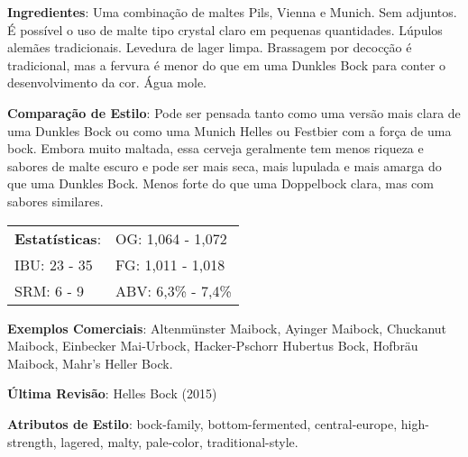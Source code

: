 \textbf{Ingredientes}: Uma combinação de maltes Pils, Vienna e Munich. Sem adjuntos. É possível o uso de malte tipo crystal claro em pequenas quantidades. Lúpulos alemães tradicionais. Levedura de lager limpa. Brassagem por decocção é tradicional, mas a fervura é menor do que em uma Dunkles Bock para conter o desenvolvimento da cor. Água mole.

\textbf{Comparação de Estilo}: Pode ser pensada tanto como uma versão mais clara de uma Dunkles Bock ou como uma Munich Helles ou Festbier com a força de uma bock. Embora muito maltada, essa cerveja geralmente tem menos riqueza e sabores de malte escuro e pode ser mais seca, mais lupulada e mais amarga do que uma Dunkles Bock. Menos forte do que uma Doppelbock clara, mas com sabores similares.

\begin{tabular}{@{}p{35mm}p{35mm}@{}}
  \textbf{Estatísticas}: & OG: 1,064 - 1,072 \\
  IBU: 23 - 35  & FG: 1,011 - 1,018  \\
  SRM: 6 - 9  & ABV: 6,3\% - 7,4\%
\end{tabular}

\textbf{Exemplos Comerciais}: Altenmünster Maibock, Ayinger Maibock, Chuckanut Maibock, Einbecker Mai-Urbock, Hacker-Pschorr Hubertus Bock, Hofbräu Maibock, Mahr’s Heller Bock.

\textbf{Última Revisão}: Helles Bock (2015)

\textbf{Atributos de Estilo}: bock-family, bottom-fermented, central-europe, high-strength, lagered, malty, pale-color, traditional-style.
